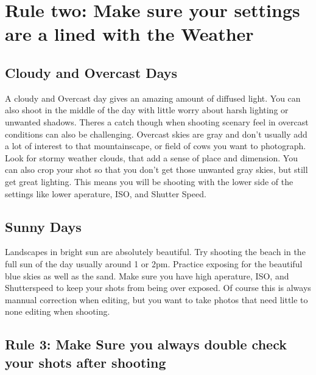 \documentclass[
]{book}
\begin{document}
\hypertarget{rule-two-make-sure-your-settings-are-a-lined-with-the-weather}{%
\section{Rule two: Make sure your settings are a lined with the Weather}\label{rule-two-make-sure-your-settings-are-a-lined-with-the-weather}}

\hypertarget{cloudy-and-overcast-days}{%
\subsection{Cloudy and Overcast Days}\label{cloudy-and-overcast-days}}

A cloudy and Overcast day gives an amazing amount of diffused light. You can also shoot in the middle of the day with little worry about harsh lighting or unwanted shadows. Theres a catch though when shooting scenary feel in overcast conditions can also be challenging. Overcast skies are gray and don't usually add a lot of interest to that mountainscape, or field of cows you want to photograph. Look for stormy weather clouds, that add a sense of place and dimension. You can also crop your shot so that you don't get those unwanted gray skies, but still get great lighting. This means you will be shooting with the lower side of the settings like lower aperature, ISO, and Shutter Speed.

\hypertarget{sunny-days}{%
\subsection{Sunny Days}\label{sunny-days}}

Landscapes in bright sun are absolutely beautiful. Try shooting the beach in the full sun of the day usually around 1 or 2pm. Practice exposing for the beautiful blue skies as well as the sand. Make sure you have high aperature, ISO, and Shutterspeed to keep your shots from being over exposed. Of course this is always mannual correction when editing, but you want to take photos that need little to none editing when shooting.

\hypertarget{rule-3-make-sure-you-always-double-check-your-shots-after-shooting}{%
\subsection{Rule 3: Make Sure you always double check your shots after shooting}\label{rule-3-make-sure-you-always-double-check-your-shots-after-shooting}}
\end{document}
